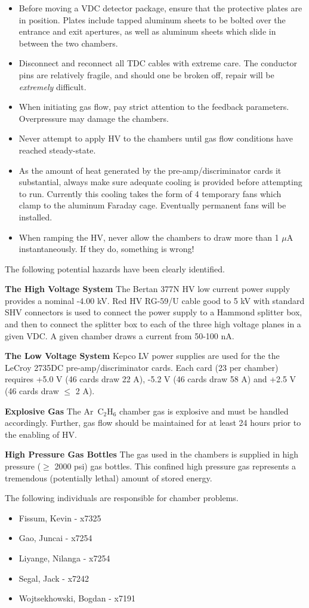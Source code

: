 \begin{itemize}
\item{Before moving a VDC detector package, ensure that the protective
plates are in position.  Plates include tapped aluminum sheets to
be bolted over the entrance and exit apertures, as well as aluminum
sheets which slide in between the two chambers.}
\item{Disconnect and reconnect all TDC cables with extreme care.  The
conductor pins are relatively fragile, and should one be broken off,
repair will be {\it extremely} difficult.}
\item{When initiating gas flow, pay strict attention to the feedback
parameters.  Overpressure may damage the chambers.}
\item{Never attempt to apply HV to the chambers until gas flow
conditions have reached steady-state.}
\item{As the amount of heat generated by the pre-amp/discriminator
cards it substantial, always make sure adequate cooling is provided
before attempting to run.  Currently this cooling takes the form of
4 temporary fans which clamp to the aluminum Faraday cage.  Eventually
permanent fans will be installed.}
\item{When ramping the HV, never allow the chambers to draw more than
1 $\mu$A instantaneously.  If they do, something is wrong!}
\end{itemize}

The following potential hazards have been clearly identified.
\begin{description}
\item {\bf The High Voltage System}
The Bertan 377N HV low current power supply provides a nominal
-4.00 kV.  Red HV RG-59/U cable good to 5 kV with standard SHV
connectors is used to connect the power supply to a Hammond splitter
box, and then to connect the splitter box to each of the three high
voltage planes in a given VDC.  A given chamber draws a current
from  50-100 nA.
\item {\bf The Low Voltage System}
Kepco LV power supplies are used for the the LeCroy 2735DC
pre-amp/discriminator cards.  Each card (23 per chamber) requires
+5.0 V (46 cards draw 22 A), -5.2 V (46 cards draw 58 A) and +2.5 V
(46 cards draw $\leq$ 2 A).
\item{\bf Explosive Gas} The Ar~C$_2$H$_6$ chamber gas is explosive
and must be handled accordingly.  Further, gas flow should be maintained
for at least 24 hours prior to the enabling of HV.
\item{\bf High Pressure Gas Bottles} The gas used in the chambers
is supplied in high pressure ($\ge$ 2000 psi) gas bottles. This
confined high pressure gas represents a tremendous (potentially lethal)
amount of stored energy.
\end{description}

The following individuals are responsible for chamber problems. 
\begin{itemize} 
\item[~]Fissum, Kevin - x7325 
\item[~]Gao, Juncai - x7254 
\item[~]Liyange, Nilanga - x7254 
\item[~]Segal, Jack - x7242 
\item[~]Wojtsekhowski, Bogdan - x7191 
\end{itemize} 
